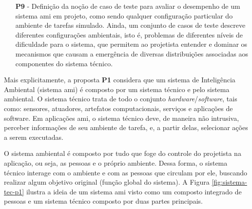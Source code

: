 \begin{itemize}
    \item[\textbf{P9} -] Definição da noção de caso de teste para avaliar o desempenho de um sistema \acrshort{ami} em projeto, como sendo qualquer configuração particular do ambiente de tarefas simulado. Ainda, um conjunto de casos de teste descreve diferentes configurações ambientais, isto é, problemas de diferentes níveis de dificuldade para o sistema, que permitem ao projetista entender e dominar os mecanismos que causam a emergência de diversas distribuições associadas aos componentes do sistema técnico.
    
\end{itemize}

    Mais explicitamente, a proposta \textbf{P1} considera que um sistema de Inteligência Ambiental (sistema \acrshort{ami}) é composto por um sistema técnico e pelo sistema ambiental. O sistema técnico trata de todo o conjunto \textit{hardware}/\textit{software}, tais como: sensores, atuadores, artefatos computacionais, serviços e aplicações de software. Em aplicações \acrshort{ami}, o sistema técnico deve, de maneira não intrusiva, perceber informações de seu ambiente de tarefa, e, a partir delas, selecionar ações a serem executadas.    
    
    O sistema ambiental é composto por tudo que foge do controle do projetista na aplicação, ou seja, as pessoas e o próprio ambiente. Dessa forma, o sistema técnico interage com o ambiente e com as pessoas que circulam por ele, buscando realizar algum objetivo original (função global do sistema). A Figura \ref{fig:sistema-tec-p1} ilustra a ideia de um sistema \acrshort{ami} visto como um composto integrado de pessoas e um sistema técnico composto por duas partes principais. 

   
    \begin{figure}[h!]
        \centering
    \end{figure}
    
